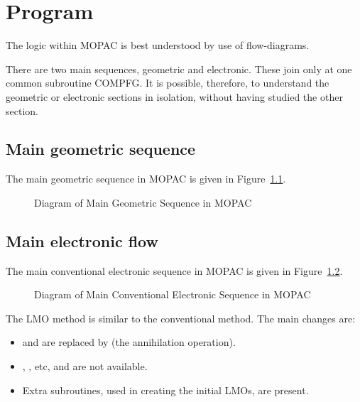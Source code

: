 \chapter{Program}
The logic within MOPAC is best understood by use of flow-diagrams.

There are two main sequences, geometric and electronic.  These join only  at
one  common  subroutine COMPFG.  It is possible, therefore, to understand the
geometric or electronic sections  in  isolation,  without having studied the
other section.

\section{Main geometric sequence}
The main geometric sequence in MOPAC is given in Figure~\ref{picgeo}.
\begin{figure}
\begin{makeimage}
\end{makeimage}
\begin{center}
\hspace*{-1.0in}

\end{center}
\caption{\label{picgeo}Diagram of Main Geometric Sequence in MOPAC}
\end{figure}

\section{Main electronic flow}
The main conventional electronic sequence in MOPAC is given in
Figure~\ref{picelec}.
\begin{figure}
\begin{makeimage}
\end{makeimage}
\begin{center}
\hspace*{-0.5in}

\end{center}
\caption{\label{picelec}Diagram of Main Conventional Electronic Sequence in
MOPAC}
\end{figure}

The LMO method is similar to the conventional method.  The main changes are:
\begin{itemize}
\item {} and  are replaced by 
(the annihilation operation).
\item {},  , etc, and  are not available.
\item Extra subroutines, used in creating the initial LMOs, are present.
\end{itemize}

